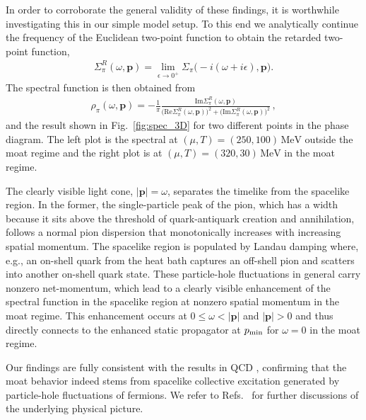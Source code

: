 \documentclass[reprint,english,superscriptaddress,preprintnumbers,amsmath,amssymb,aps,prd]{revtex4-2}
\def\Fig#1{Fig.~\ref{#1}}
\begin{document}
In order to corroborate the general validity of these findings, it is worthwhile investigating this in our simple model setup. To this end we analytically continue the frequency of the Euclidean two-point function to obtain the retarded two-point function,
\begin{align}
\Sigma^R_\pi(\omega,\boldsymbol{p}) = \lim_{\epsilon\rightarrow 0^+} \Sigma_\pi\big(-i(\omega+i\epsilon),\boldsymbol{p}\big).
\end{align}
The spectral function is then obtained from
%
\begin{align}
\rho_\pi(\omega,\boldsymbol{p})=-\frac{1}{\pi}\frac{\mathrm{Im}\Sigma^R_\pi(\omega,\boldsymbol{p})}{\big(\mathrm{Re}\Sigma^R_\pi(\omega,\boldsymbol{p})\big)^2+\big(\mathrm{Im}\Sigma^R_\pi(\omega,\boldsymbol{p})\big)^2}\,,
\end{align}
%
and the result shown in \Fig{fig:spec_3D} for two different points in the phase diagram. The left plot is the spectral at $(\mu, T)=(250,100)\,\mathrm{MeV}$ outside the moat regime and the right plot is at $(\mu, T)=(320,30)\,\mathrm{MeV}$ in the moat regime. 

The clearly visible light cone, $|\boldsymbol{p}|=\omega$, separates the timelike from the spacelike region. In the former, the single-particle peak of the pion, which has a width because it sits above the threshold of quark-antiquark creation and annihilation, follows a normal pion dispersion that monotonically increases with increasing spatial momentum. The spacelike region is populated by Landau damping where, e.g., an on-shell quark from the heat bath captures an off-shell pion and scatters into another on-shell quark state. These particle-hole fluctuations in general carry nonzero net-momentum, which lead to a clearly visible enhancement of the spectral function in the spacelike region at nonzero spatial momentum in the moat regime. This enhancement occurs at $0 \leq \omega < |\boldsymbol{p}|$ and $|\boldsymbol{p}| > 0$ and thus directly connects to the enhanced static propagator at $p_{\rm min}$ for $\omega = 0$ in the moat regime.

Our findings are fully consistent with the results in QCD \cite{Fu:2024rto}, confirming that the moat behavior indeed stems from spacelike collective excitation generated by particle-hole fluctuations of fermions. We refer to Refs.\ \cite{Fu:2024rto, Rennecke:2025kub} for further discussions of the underlying physical picture.
\end{document}
